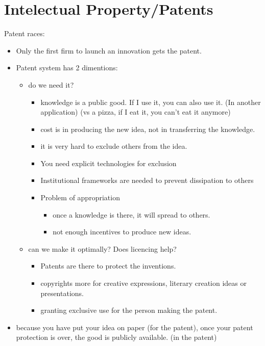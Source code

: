 \documentclass[12pt, a4paper, titlepage]{extarticle}
\begin{document}
\section{Intelectual Property/Patents}
Patent races:
\begin{itemize}
    \item Only the first firm to launch an innovation gets the patent.
    \item Patent system has 2 dimentions:
    \begin{itemize}
        \item do we need it?
        \begin{itemize}
            \item knowledge is a public good. If I use it, you can also use it. (In another application) (vs a pizza, if I eat it, you can't eat it anymore)
            \item cost is in producing the new idea, not in transferring the knowledge.
            \item it is very hard to exclude others from the idea.
            \item You need explicit technologies for exclusion
            \item Institutional frameworks are needed to prevent dissipation to others
            \item Problem of appropriation
            \begin{itemize}
                \item once a knowledge is there, it will spread to others.
                \item not enough incentives to produce new ideas.
            \end{itemize}
        \end{itemize}
        \item can we make it optimally? Does licencing help?
        \begin{itemize}
            \item Patents are there to protect the inventions.
            \item copyrights more for creative expressions, literary creation ideas or presentations.
            \item granting exclusive use for the person making the patent. 
        \end{itemize}
    \end{itemize}
    \item because you have put your idea on paper (for the patent), once your patent protection is over, the good is publicly available. (in the patent)

\end{itemize}
\end{document}
